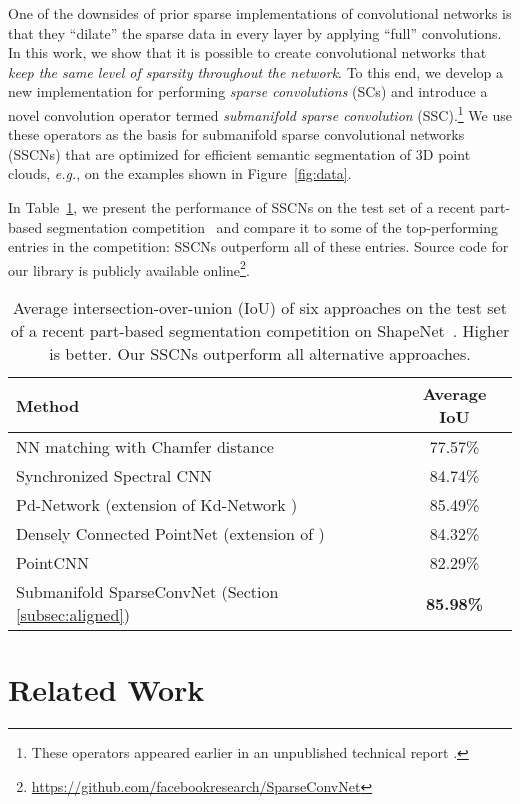 \documentclass[10pt,twocolumn,letterpaper]{article}
\begin{document}
One of the downsides of prior sparse implementations of convolutional networks is that they ``dilate'' the sparse data in every layer by applying ``full'' convolutions. In this work, we show that it is possible to create convolutional networks that
\emph{keep the same level of sparsity throughout the network}.
To this end, we develop a new implementation for performing \emph{sparse convolutions} (SCs) and introduce a novel convolution operator termed \emph{submanifold sparse convolution} (SSC).\footnote{These operators appeared earlier in an unpublished technical report \cite{graham2017submanifold}.}
We use these operators as the basis for submanifold sparse convolutional networks (SSCNs) that are optimized for efficient semantic segmentation of 3D point clouds, \emph{e.g.}, on the examples shown in Figure~\ref{fig:data}.

In Table~\ref{tab:seg_results}, we present the performance of SSCNs on the test set of a recent part-based segmentation competition~\cite{yi2017large} and compare it to some of the top-performing entries in the competition: SSCNs outperform all of these entries. Source code for our library is publicly available online\footnote{\url{https://github.com/facebookresearch/SparseConvNet}}.


\begin{table}[t]
  \centering
  \small
  \begin{tabular}{lc}
    \toprule
    {\bf Method} & {\bf Average IoU}\\
    \midrule
    NN matching with Chamfer distance & 77.57\% \\
    Synchronized Spectral CNN \cite{yi2016syncspeccnn} & 84.74\% \\
    \midrule
    Pd-Network (extension of Kd-Network \cite{klokov2017escape}) & 85.49\% \\
    Densely Connected PointNet (extension of \cite{qi2016pointnet}) & 84.32\% \\
    PointCNN & 82.29\% \\
    \midrule
    Submanifold SparseConvNet (Section \ref{subsec:aligned}) & \textbf{85.98\%} \\
    \bottomrule
  \end{tabular}
    \caption{Average intersection-over-union (IoU) of six approaches on the test set of a recent part-based segmentation competition on ShapeNet~\cite{yi2017large}. Higher is better. Our SSCNs outperform all alternative approaches.}
  \label{tab:seg_results}
\end{table}
 \section{Related Work}
\end{document}
